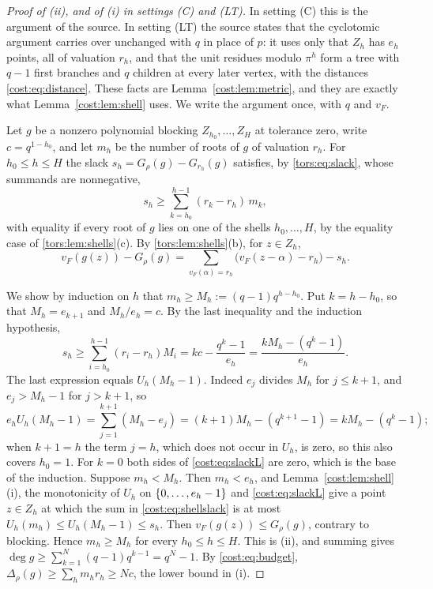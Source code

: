 \begin{proof}[Proof of \textup{(ii)}, and of \textup{(i)} in settings \textup{(C)} and \textup{(LT)}]
In setting \textup{(C)} this is the argument of the source. In setting \textup{(LT)} the
source states that the cyclotomic argument carries over unchanged with $q$ in place of $p$:
it uses only that $Z_h$ has $e_h$ points, all of valuation $r_h$, and that the unit
residues modulo $\pi^h$ form a tree with $q-1$ first branches and $q$ children at every
later vertex, with the distances \eqref{cost:eq:distance}. These facts are
Lemma~\ref{cost:lem:metric}, and they are exactly what Lemma~\ref{cost:lem:shell} uses.
We write the argument once, with $q$ and $v_F$.

Let $g$ be a nonzero polynomial blocking $Z_{h_0},\ldots,Z_H$ at tolerance zero, write
$c=q^{1-h_0}$, and let $m_h$ be the number of roots of $g$ of valuation $r_h$. For
$h_0\le h\le H$ the slack $s_h=G_\rho(g)-G_{r_h}(g)$ satisfies, by \eqref{tors:eq:slack},
whose summands are nonnegative,
\[
 s_h\ge\sum_{k=h_0}^{h-1}(r_k-r_h)\,m_k ,
\]
with equality if every root of $g$ lies on one of the shells $h_0,\ldots,H$, by the
equality case of \cref{tors:lem:shells}(c). By \cref{tors:lem:shells}(b), for $z\in Z_h$,
\begin{equation}\label{cost:eq:shellslack}
 v_F(g(z))-G_\rho(g)=\sum_{v_F(\alpha)=r_h}\bigl(v_F(z-\alpha)-r_h\bigr)-s_h .
\end{equation}

We show by induction on $h$ that $m_h\ge M_h:=(q-1)q^{h-h_0}$. Put $k=h-h_0$, so that
$M_h=e_{k+1}$ and $M_h/e_h=c$. By the last inequality and the induction hypothesis,
\begin{equation}\label{cost:eq:slackL}
 s_h\ge\sum_{i=h_0}^{h-1}(r_i-r_h)M_i=kc-\frac{q^k-1}{e_h}=\frac{kM_h-(q^k-1)}{e_h}.
\end{equation}
The last expression equals $U_h(M_h-1)$. Indeed $e_j$ divides $M_h$ for $j\le k+1$, and
$e_j>M_h-1$ for $j>k+1$, so
\[
 e_hU_h(M_h-1)=\sum_{j=1}^{k+1}(M_h-e_j)=(k+1)M_h-(q^{k+1}-1)=kM_h-(q^k-1);
\]
when $k+1=h$ the term $j=h$, which does not occur in $U_h$, is zero, so this also covers
$h_0=1$. For $k=0$ both sides of \eqref{cost:eq:slackL} are zero, which is the base of the
induction. Suppose $m_h<M_h$. Then $m_h<e_h$, and Lemma~\ref{cost:lem:shell}(i), the
monotonicity of $U_h$ on $\{0,\ldots,e_h-1\}$ and \eqref{cost:eq:slackL} give a point
$z\in Z_h$ at which the sum in \eqref{cost:eq:shellslack} is at most
$U_h(m_h)\le U_h(M_h-1)\le s_h$. Then $v_F(g(z))\le G_\rho(g)$, contrary to blocking.
Hence $m_h\ge M_h$ for every $h_0\le h\le H$. This is (ii), and summing gives
$\deg g\ge\sum_{k=1}^N(q-1)q^{k-1}=q^N-1$. By \eqref{cost:eq:budget},
$\Delta_\rho(g)\ge\sum_hm_hr_h\ge Nc$, the lower bound in (i).


\end{proof}
